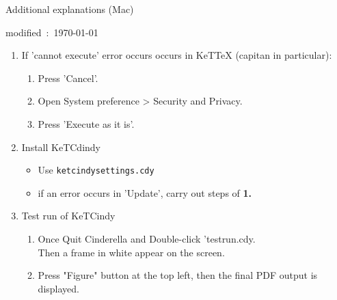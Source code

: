 \documentclass{article}
\begin{document}
\begin{center}
Additional explanations (Mac)
\end{center}

\hfill modified\ :\ \today

\begin{enumerate}[\bf\large 1.]


\item If 'cannot execute' error occurs occurs in KeTTeX (capitan in particular):
    \begin{enumerate}[(1)]
    \item Press 'Cancel'.
    \item Open System preference > Security and Privacy.
    \item Press 'Execute as it is'.
    \end{enumerate}


\item Install KeTCdindy
  \begin{itemize}
  \item Use \verb|ketcindysettings.cdy|
  \item if an error occurs in 'Update', carry out steps of  {\bf 1.}
  \end{itemize}

\item Test run of KeTCindy
 \begin{enumerate}[(1)]
  \item Once Quit Cinderella and Double-click 'testrun.cdy.\\
  \hspace*{10mm}Then a frame in white appear on the screen.  
  \item Press "Figure" button at the top left, then the final PDF output is displayed. 


\end{enumerate}
\end{enumerate}
\end{document}
